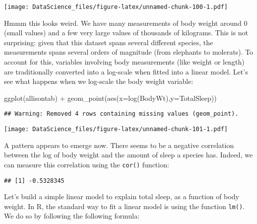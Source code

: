 \documentclass[
]{book}
\newenvironment{Shaded}{\begin{snugshade}}{\end{snugshade}}
\newcommand{\AttributeTok}[1]{\textcolor[rgb]{0.77,0.63,0.00}{#1}}
\newcommand{\FunctionTok}[1]{\textcolor[rgb]{0.00,0.00,0.00}{#1}}
\newcommand{\NormalTok}[1]{#1}
\newcommand{\SpecialCharTok}[1]{\textcolor[rgb]{0.00,0.00,0.00}{#1}}
\newcommand{\StringTok}[1]{\textcolor[rgb]{0.31,0.60,0.02}{#1}}
\begin{document}
\texttt{[image: DataScience\_files/figure-latex/unnamed-chunk-100-1.pdf]}

Hmmm this looks weird. We have many measurements of body weight around 0 (small values) and a few very large values of thousands of kilograms. This is not surprising: given that this dataset spans several different species, the measurements spans several orders of magnitude (from elephants to molerats). To account for this, variables involving body measurements (like weight or length) are traditionally converted into a log-scale when fitted into a linear model. Let's see what happens when we log-scale the body weight variable:

\begin{Shaded}
\begin{Highlighting}[]
\FunctionTok{ggplot}\NormalTok{(allisontab) }\SpecialCharTok{+} \FunctionTok{geom\_point}\NormalTok{(}\FunctionTok{aes}\NormalTok{(}\AttributeTok{x=}\FunctionTok{log}\NormalTok{(BodyWt),}\AttributeTok{y=}\NormalTok{TotalSleep))}
\end{Highlighting}
\end{Shaded}

\begin{verbatim}
## Warning: Removed 4 rows containing missing values (geom_point).
\end{verbatim}

\texttt{[image: DataScience\_files/figure-latex/unnamed-chunk-101-1.pdf]}

A pattern appears to emerge now. There seems to be a negative correlation between the log of body weight and the amount of sleep a species has. Indeed, we can measure this correlation using the \texttt{cor()} function:

\begin{Shaded}
\end{Shaded}

\begin{verbatim}
## [1] -0.5328345
\end{verbatim}

Let's build a simple linear model to explain total sleep, as a function of body weight. In R, the standard way to fit a linear model is using the function \texttt{lm()}. We do so by following the following formula:
\end{document}
